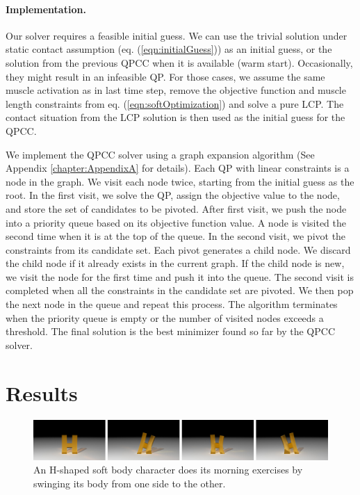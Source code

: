 \paragraph{Implementation.}
Our solver requires a feasible initial guess. We can use the trivial solution under static contact assumption (eq. (\ref{eqn:initialGuess})) as an initial guess, or the solution from the previous QPCC when it is available (warm start). Occasionally, they might result in an infeasible QP. For those cases, we assume the same muscle activation as in last time step, remove the objective function and muscle length constraints from eq. (\ref{eqn:softOptimization}) and solve a pure LCP. The contact situation from the LCP solution is then used as the initial guess for the QPCC.

We implement the QPCC solver using a graph expansion algorithm (See Appendix \ref{chapter:AppendixA} for details). Each
QP with linear constraints is a node in the graph. We visit each node
twice, starting from the initial guess as the root. In the first
visit, we solve the QP, assign the objective value to the
node, and store the set of candidates to be pivoted. After first
visit, we push the node into a priority queue based on its objective
function value. A node is visited the second time when it is at the
top of the queue. In the second visit, we pivot the constraints from
its candidate set. Each pivot generates a child node. We discard the
child node if it already exists in the current graph. If the child
node is new, we visit the node for the first time and push it into the
queue. The second visit is completed when all the constraints in the
candidate set are pivoted. We then pop the next node in the queue and
repeat this process. The algorithm terminates when the priority queue
is empty or the number of visited nodes exceeds a threshold. The final
solution is the best minimizer found so far by the QPCC solver.

\section{Results}

\label{sec:softResults}
\begin{figure}[ht]
\centering
\includegraphics[width=\textwidth]{figures/HSwing.eps}
\caption{An H-shaped soft body character does its morning exercises by swinging its body from one side to the other.}
\label{fig:HSwing}
\end{figure}

